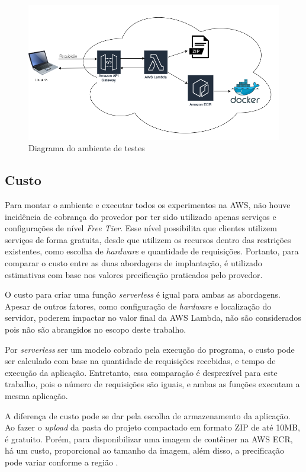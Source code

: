 \documentclass[conference]{IEEEtran}
\begin{document}
\begin{figure}[H]
    \centering 
    \includegraphics [width=\linewidth]{images/environment-diagram-PT.png}
    \par
    \caption{Diagrama do ambiente de testes}
    \label{fig:env_diagram}
\end{figure}

\subsection{Custo}
\label{subsec:cost}

Para montar o ambiente e executar todos os experimentos na AWS, não houve incidência de cobrança do provedor por ter sido utilizado apenas serviços e configurações de nível \textit{Free Tier}. Esse nível possibilita que clientes utilizem serviços de forma gratuita, desde que utilizem os recursos dentro das restrições existentes, como escolha de \textit{hardware} e quantidade de requisições. Portanto, para comparar o custo entre as duas abordagens de implantação, é utilizado estimativas com base nos valores precificação praticados pelo provedor.

O custo para criar uma função \textit{serverless}  é igual para ambas as abordagens. Apesar de outros fatores, como configuração de \textit{hardware} e localização do servidor, poderem impactar no valor final da AWS Lambda, não são considerados pois não são abrangidos no escopo deste trabalho.

Por \textit{serverless} ser um modelo cobrado pela execução do programa, o custo pode ser calculado com base na quantidade de requisições recebidas, e tempo de execução da aplicação. Entretanto, essa comparação é desprezível para este trabalho, pois o número de requisições são iguais, e ambas as funções executam a mesma aplicação.

A diferença de custo pode se dar pela escolha de armazenamento da aplicação. Ao fazer o \textit{upload} da pasta do projeto compactado em formato ZIP de até 10MB, é gratuito. Porém, para disponibilizar uma imagem de contêiner na AWS ECR, há um custo, proporcional ao tamanho da imagem, além disso, a precificação pode variar conforme a regiäo \cite{aws_2023_ecr_pricing}. 
\end{document}
